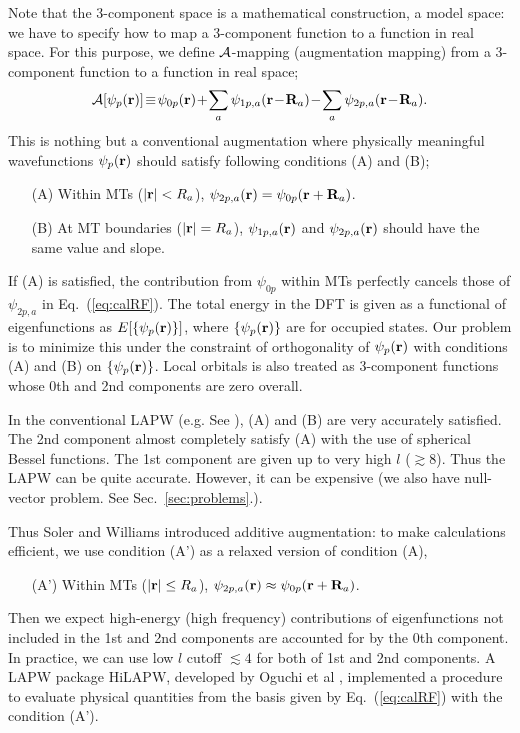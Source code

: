 \documentclass[a4paper,10pt,aip,onecolumn,amsmath,amssymb,floatfix,rmp]{revtex4-1}
\newcommand{\bfr}{{\bf r}}
\newcommand{\bfR}{{\bf R}}
\def\calR{{\cal A}}
\newcommand{\req}[1]{\mbox{Eq.~\!(\ref{#1})}}
\newcommand{\refsec}[1]{\mbox{Sec.~\!\ref{#1}}}
\begin{document}
Note that the 3-component space is a mathematical
construction, a model space: we have to specify how to map a 3-component 
function to a function in real space.
For this purpose, we define $\calR$-mapping (augmentation mapping)
from a 3-component function to a function in real space;
\begin{eqnarray}
\calR[\psi_p(\bfr)]\!\equiv\! \psi_{0p}(\bfr)
\!+\! \sum_a \psi_{1p,a}(\bfr\!-\!\bfR_a)\!-\!\sum_a \psi_{2p,a}(\bfr\!-\!\bfR_a). \nonumber \\
\label{eq:calRF}
\end{eqnarray}
This is nothing but a conventional augmentation 
where physically meaningful wavefunctions $\psi_{p}(\bfr)$ 
should satisfy following conditions (A) and (B);
\begin{itemize}
\item[(A)]
Within MTs ($|\bfr|<R_a$), $\psi_{2p,a}(\bfr)=\psi_{0p}(\bfr+\bfR_a)$.
\item[(B)]
At MT boundaries ($|\bfr|=R_a$), $\psi_{1p,a}(\bfr)$ and $\psi_{2p,a}(\bfr)$
should have the same value and slope.
\end{itemize}
If (A) is satisfied, the contribution from $\psi_{0p}$ within MTs 
perfectly cancels those of $\psi_{2p,a}$ in \req{eq:calRF}. 
The total energy in the DFT is given as a functional
of eigenfunctions as $E[\{\psi_{p}(\bfr)\}]$, where
$\{\psi_{p}(\bfr)\}$ are for occupied states.
Our problem is to minimize this under the constraint of
orthogonality of $\psi_{p}(\bfr)$ with conditions 
(A) and (B) on $\{\psi_{p}(\bfr)\}$.
Local orbitals \cite{PhysRevB.43.6388} is also treated as 3-component
functions whose 0th and 2nd components are zero overall.

In the conventional LAPW (e.g. See \cite{bluegel31,Singhbook}),
(A) and (B) are very accurately satisfied. The 2nd component
almost completely satisfy (A) with the use of spherical Bessel functions.
The 1st component are given up to very high $l$ ($\gtrsim 8$). 
Thus the LAPW can be quite accurate. However, it can be 
expensive (we also have null-vector problem. See \refsec{sec:problems}.).

Thus Soler and Williams \cite{soler89} introduced additive augmentation:
to make calculations efficient, we use condition (A') as a 
relaxed version of condition (A),
\begin{itemize}
\item[(A')]
Within MTs ($|\bfr|\leq R_a$), 
$\psi_{2p,a}(\bfr) \approx \psi_{0p}(\bfr+\bfR_a)$.
\end{itemize}
Then we expect high-energy (high frequency) contributions
of eigenfunctions not included in the 1st and 2nd components 
are accounted for by the 0th component. In practice, we can use low $l$ 
cutoff $\lesssim 4$ for both of 1st and 2nd components. 
A LAPW package HiLAPW, developed by Oguchi et al \cite{PhysRevB.54.1159},
implemented a procedure to evaluate physical quantities from 
the basis given by \req{eq:calRF} with the condition (A').
\end{document}
